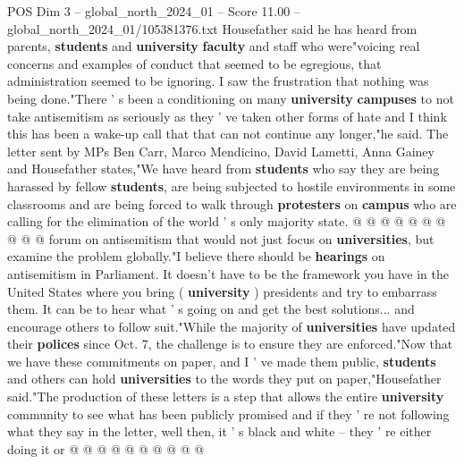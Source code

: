 \begin{textsample}{POS Dim 3 – global\_north\_2024\_01 – Score 11.00 – global\_north\_2024\_01/105381376.txt}
Housefather said he has heard from parents, \textbf{students} and \textbf{university} \textbf{faculty} and staff who were"voicing real concerns and examples of conduct that seemed to be egregious, that administration seemed to be ignoring.
I saw the frustration that nothing was being done."There ' s been a conditioning on many \textbf{university} \textbf{campuses} to not take antisemitism as seriously as they ' ve taken other forms of hate and I think this has been a wake-up call that that can not continue any longer,"he said.
The letter sent by MPs Ben Carr, Marco Mendicino, David Lametti, Anna Gainey and Housefather states,"We have heard from \textbf{students} who say they are being harassed by fellow \textbf{students}, are being subjected to hostile environments in some classrooms and are being forced to walk through \textbf{protesters} on \textbf{campus} who are calling for the elimination of the world ' s only majority state. @ @ @ @ @ @ @ @ @ @ forum on antisemitism that would not just focus on \textbf{universities}, but examine the problem globally."I believe there should be \textbf{hearings} on antisemitism in Parliament.
It doesn't have to be the framework you have in the United States where you bring ( \textbf{university} ) presidents and try to embarrass them.
It can be to hear what ' s going on and get the best solutions... and encourage others to follow suit."While the majority of \textbf{universities} have updated their \textbf{polices} since Oct. 7, the challenge is to ensure they are enforced."Now that we have these commitments on paper, and I ' ve made them public, \textbf{students} and others can hold \textbf{universities} to the words they put on paper,"Housefather said."The production of these letters is a step that allows the entire \textbf{university} community to see what has been publicly promised and if they ' re not following what they say in the letter, well then, it ' s black and white -- they ' re either doing it or @ @ @ @ @ @ @ @ @ @

\end{textsample}
